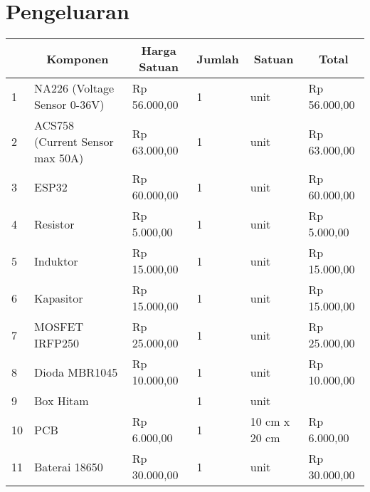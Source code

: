 \section{Pengeluaran}
\begin{table}[H]
	\centering
	
	\label{Harga Komponen}
	\begin{tabularx}{\linewidth}{
			|p{}%
			|p{} %
			|p{}%
			|p{}%
			|p{}%
			|p{}|%
		}
		\hline
		\rowcolor{blue!20} %
		\multicolumn{1}{|c|}{\textbf{No.}} & 
		\multicolumn{1}{|c|}{\textbf{Komponen}} &
		\multicolumn{1}{c|}{\textbf{Harga Satuan}} & 
		\multicolumn{1}{c|}{\textbf{Jumlah}} &
		\multicolumn{1}{c|}{\textbf{Satuan}} &
		\multicolumn{1}{c|}{\textbf{Total}}\\ \hline
		1 & NA226 (Voltage Sensor 0-36V) & Rp 56.000,00 & 1 & unit  & Rp 56.000,00  \\ \hline
		2 & ACS758 (Current Sensor max 50A)&  Rp 63.000,00 & 1 & unit  & Rp 63.000,00  \\\hline
		3 & ESP32  & Rp 60.000,00  & 1 & unit &  Rp 60.000,00  \\ \hline
		4 &  Resistor & Rp 5.000,00 & 1 & unit & Rp 5.000,00 \\ \hline
		5 &  Induktor & Rp 15.000,00 & 1 & unit & Rp 15.000,00 \\ \hline
		6 &  Kapasitor & Rp 15.000,00 & 1 & unit & Rp 15.000,00 \\ \hline
		7 &  MOSFET IRFP250 & Rp 25.000,00 & 1 & unit & Rp 25.000,00 \\ \hline
		8 &  Dioda MBR1045 & Rp 10.000,00 & 1 & unit & Rp 10.000,00 \\ \hline
		9 &  Box Hitam &  & 1 & unit & \\ \hline
		10 &  PCB & Rp 6.000,00 & 1 &10 cm x 20 cm & Rp 6.000,00\\ \hline
		11 & Baterai 18650 & Rp 30.000,00 & 1 & unit & Rp 30.000,00 \\ \hline
		
		
		
	\end{tabularx}
\end{table}